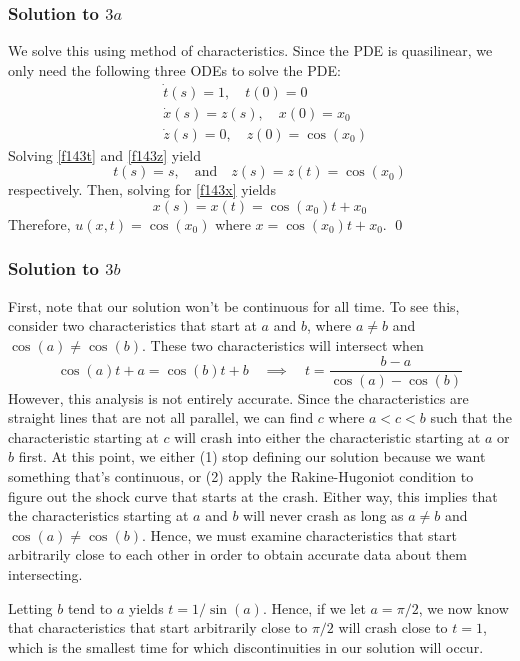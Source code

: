 \subsubsection*{Solution to $3a$}

We solve this using method of characteristics. Since the PDE is quasilinear, we only need the following three ODEs to solve the PDE:
\begin{align}
\label{f143t} &\dot{t}(s) = 1, \quad t(0) = 0 \\
\label{f143x} &\dot{x}(s) = z(s), \quad x(0) = x_0 \\
\label{f143z} &\dot{z}(s) = 0, \quad z(0) = \cos(x_0)
\end{align}
Solving \eqref{f143t} and \eqref{f143z} yield
$$ t(s) = s, \quad \text{and} \quad z(s) = z(t) = \cos(x_0) $$
respectively. Then, solving for \eqref{f143x} yields
$$ x(s) = x(t) = \cos(x_0) t + x_0 $$
Therefore, $u(x,t) = \cos(x_0)$ where $x = \cos(x_0)t + x_0$. \hfill \qed

\subsubsection*{Solution to $3b$}

First, note that our solution won't be continuous for all time. To see this, consider two characteristics that start at $a$ and $b$, where $a \neq b$ and $\cos(a) \neq \cos(b)$. These two characteristics will intersect when
$$ \cos(a) t + a = \cos(b) t + b \quad \implies \quad t = \frac{b-a}{\cos(a) - \cos(b)} $$
However, this analysis is not entirely accurate. Since the characteristics are straight lines that are not all parallel, we can find $c$ where $a < c < b$ such that the characteristic starting at $c$ will crash into either the characteristic starting at $a$ or $b$ first. At this point, we either (1) stop defining our solution because we want something that's continuous, or (2) apply the Rakine-Hugoniot condition to figure out the shock curve that starts at the crash. Either way, this implies that the characteristics starting at $a$ and $b$ will never crash as long as $a \neq b$ and $\cos(a) \neq \cos(b)$. Hence, we must examine characteristics that start arbitrarily close to each other in order to obtain accurate data about them intersecting.

Letting $b$ tend to $a$ yields $t = 1/\sin(a)$. Hence, if we let $a = \pi/2$, we now know that characteristics that start arbitrarily close to $\pi/2$ will crash close to $t=1$, which is the smallest time for which discontinuities in our solution will occur.

